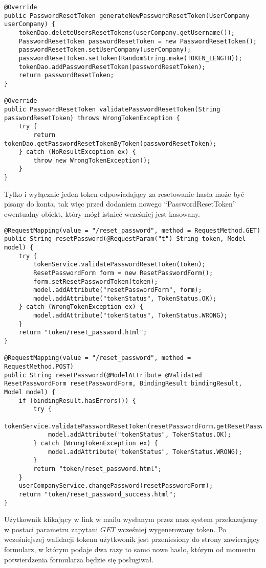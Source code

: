 \begin{center}
\begin{lstlisting}[caption={Listing kodu generującego token do odzyskiwania hasła.},captionpos=b]
@Override
public PasswordResetToken generateNewPasswordResetToken(UserCompany userCompany) {
	tokenDao.deleteUsersResetTokens(userCompany.getUsername());
	PasswordResetToken passwordResetToken = new PasswordResetToken();
	passwordResetToken.setUserCompany(userCompany);
	passwordResetToken.setToken(RandomString.make(TOKEN_LENGTH));
	tokenDao.addPasswordResetToken(passwordResetToken);
	return passwordResetToken;
}

@Override
public PasswordResetToken validatePasswordResetToken(String passwordResetToken) throws WrongTokenException {
	try {
		return tokenDao.getPasswordResetTokenByToken(passwordResetToken);
	} catch (NoResultException ex) {
		throw new WrongTokenException();
	}
}
\end{lstlisting}
\end{center}
Tylko i wyłącznie jeden token odpowiadający za resetowanie hasła może być pisany do konta, tak więc przed dodaniem nowego ``PasswordResetToken'' ewentualny obiekt, który mógł istnieć wcześniej jest kasowany.

\begin{center}
\begin{lstlisting}[caption={Listing kodu resetującego hasło.},captionpos=b]
@RequestMapping(value = "/reset_password", method = RequestMethod.GET)
public String resetPassword(@RequestParam("t") String token, Model model) {
	try {
		tokenService.validatePasswordResetToken(token);
		ResetPasswordForm form = new ResetPasswordForm();
		form.setResetPasswordToken(token);
		model.addAttribute("resetPasswordForm", form);
		model.addAttribute("tokenStatus", TokenStatus.OK);
	} catch (WrongTokenException ex) {
		model.addAttribute("tokenStatus", TokenStatus.WRONG);
	}
	return "token/reset_password.html";
}

@RequestMapping(value = "/reset_password", method = RequestMethod.POST)
public String resetPassword(@ModelAttribute @Validated ResetPasswordForm resetPasswordForm, BindingResult bindingResult, Model model) {
	if (bindingResult.hasErrors()) {
		try {
			tokenService.validatePasswordResetToken(resetPasswordForm.getResetPasswordToken());
			model.addAttribute("tokenStatus", TokenStatus.OK);
		} catch (WrongTokenException ex) {
			model.addAttribute("tokenStatus", TokenStatus.WRONG);
		}
		return "token/reset_password.html";
	}
	userCompanyService.changePassword(resetPasswordForm);
	return "token/reset_password_success.html";
}
\end{lstlisting}
\end{center}
Użytkownik klikający w link w mailu wysłanym przez nasz system przekazujemy w postaci parametru zapytani $GET$ wcześniej wygenerowany token. Po wcześniejszej walidacji tokenu użytkwonik jest przeniesiony do strony zawierający formularz, w którym podaje dwa razy to samo nowe hasło, którym od momentu potwierdzenia formularza będzie się posługiwał.


